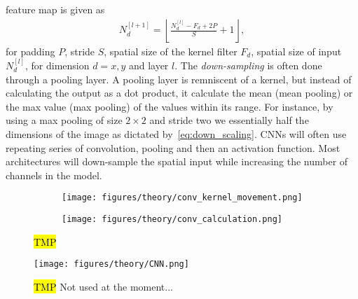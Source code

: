 feature map is given as
\begin{align}
  N_d^{[l+1]} = \left\lfloor \frac{N_d^{[l]} - F_d + 2P}{S} + 1 \right\rfloor,
  \label{eq:down_scaling}
\end{align}
for padding $P$, stride $S$, spatial size of the kernel filter $F_d$, spatial size
of input $N_d^{[l]}$, for dimension $d = {x, y}$ and layer $l$. The \textit{down-sampling} is often done through a pooling layer. A pooling layer is remniscent of a kernel, but instead of calculating the output as a dot product, it calculate the mean (mean pooling) or the max value (max pooling) of the values within its range. For instance, by using a max pooling of size $2 \times 2$ and stride two we essentially half the dimensions of the image as dictated by~\cref{eq:down_scaling}. \acrshort{CNN}s will often use repeating series of convolution, pooling and then an activation function. Most architectures will down-sample the spatial input while increasing the number of channels in the model.


\begin{figure}[H]
  \centering
  \begin{subfigure}[t]{0.26\textwidth}
    \centering
    \texttt{[image: figures/theory/conv\_kernel\_movement.png]}
    \caption{}
  \end{subfigure}
  \hfill
  \begin{subfigure}[t]{0.70\textwidth}
    \centering
    \texttt{[image: figures/theory/conv\_calculation.png]}
    \caption{}
    \label{fig:conv_calculation}
  \end{subfigure}
  \hfill
  \caption{\hl{TMP}}
  \label{fig:conv_example}
\end{figure}

\begin{figure}[H]
  \centering
  \texttt{[image: figures/theory/CNN.png]}
  \caption{\hl{TMP} Not used at the moment...}
  \label{fig:CNN}
\end{figure}


